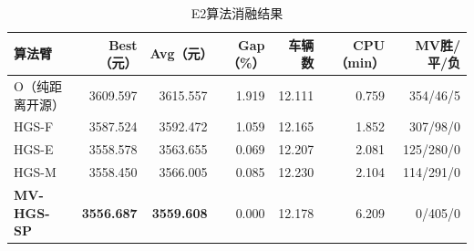 \begin{table}[htbp]
\centering
\caption{E2算法消融结果}
\label{tab:e2_ablation}
\small
\begin{tabular*}{\linewidth}{@{\extracolsep{\fill}}lrrrrrr@{}}
\toprule
算法臂 & Best（元） & Avg（元） & Gap（\%） & 车辆数 & CPU（min） & MV胜/平/负 \\
\midrule
O（纯距离开源） & 3609.597 & 3615.557 & 1.919 & 12.111 & 0.759 & 354/46/5 \\
HGS-F & 3587.524 & 3592.472 & 1.059 & 12.165 & 1.852 & 307/98/0 \\
HGS-E & 3558.578 & 3563.655 & 0.069 & 12.207 & 2.081 & 125/280/0 \\
HGS-M & 3558.450 & 3566.005 & 0.085 & 12.230 & 2.104 & 114/291/0 \\
\textbf{MV-HGS-SP} & \textbf{3556.687} & \textbf{3559.608} & 0.000 & 12.178 & 6.209 & 0/405/0 \\
\bottomrule
\end{tabular*}
\end{table}
